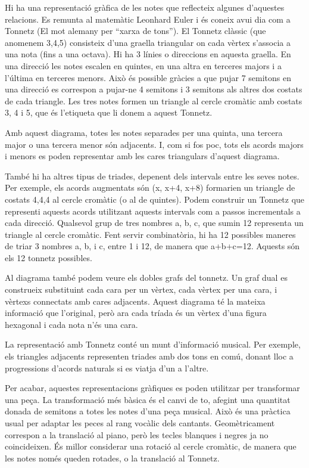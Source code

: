 Hi ha una representació gràfica de les notes que reflecteix algunes d'aquestes relacions. Es remunta al matemàtic Leonhard Euler i és coneix avui dia com a Tonnetz (El mot alemany per ``xarxa de tons''). El Tonnetz clàssic (que anomenem 3,4,5) consisteix d'una graella triangular on cada vèrtex s'associa a una nota (fins a una octava). Hi ha 3 línies o direccions en aquesta graella. En una direcció les notes escalen en quintes, en una altra en terceres majors i a l'última en terceres menors. Això és possible gràcies a que pujar 7 semitons en una direcció es correspon a pujar-ne 4 semitons i 3 semitons als altres dos costats de cada triangle. Les tres notes formen un triangle al cercle cromàtic amb costats 3, 4 i 5, que és l'etiqueta que li donem a aquest Tonnetz.

Amb aquest diagrama, totes les notes separades per una quinta, una tercera major o una tercera menor són adjacents. I, com si fos poc, tots els acords majors i menors es poden representar amb les cares triangulars d'aquest diagrama.

També hi ha altres tipus de triades, depenent dels intervals entre les seves notes. Per exemple, els acords augmentats són (x, x+4, x+8) formarien un triangle de costats 4,4,4 al cercle cromàtic (o al de quintes). Podem construir un Tonnetz que representi aquests acords utilitzant aquests intervals com a passos incrementals a cada direcció. Qualsevol grup de tres nombres a, b, c, que sumin 12 representa un triangle al cercle cromàtic. Fent servir combinatòria, hi ha 12 possibles maneres de triar 3 nombres a, b, i c, entre 1 i 12, de manera que a+b+c=12. Aquests són els 12 tonnetz possibles.

Al diagrama també podem veure els dobles grafs del tonnetz. Un graf dual es construeix substituint cada cara per un vèrtex, cada vèrtex per una cara, i vèrtexs connectats amb cares adjacents. Aquest diagrama té la mateixa informació que l'original, però ara cada tríada és un vèrtex d'una figura hexagonal i cada nota n'és una cara.

La representació amb Tonnetz conté un munt d'informació musical. Per exemple, els triangles adjacents representen triades amb dos tons en comú, donant lloc a  progressions d'acords naturals si es viatja d'un a l'altre.

Per acabar, aquestes representacions gràfiques es poden utilitzar per transformar una peça. La transformació més bàsica és el canvi de to, afegint una quantitat donada de semitons a totes les notes d'una peça musical. Això és una pràctica usual per adaptar les peces al rang vocàlic dels cantants. Geomètricament correspon a la translació al piano, però les tecles blanques i negres ja no coincideixen. És millor considerar una rotació al cercle cromàtic, de manera que les notes només queden rotades, o la translació al Tonnetz.

